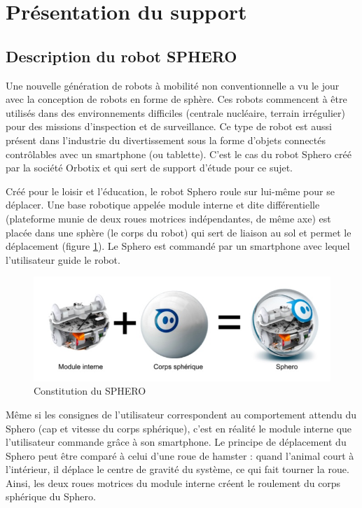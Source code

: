 

\section{Présentation du support}

\subsection{Description du robot SPHERO}

Une nouvelle génération de robots à mobilité non conventionnelle a vu le jour avec la conception de robots en forme de sphère. Ces robots commencent à être utilisés dans des environnements difficiles (centrale nucléaire, terrain irrégulier) pour des missions d'inspection et de surveillance. Ce type de robot est aussi présent dans l'industrie du divertissement sous la forme d'objets connectés contrôlables avec un smartphone (ou tablette). C'est le cas du robot Sphero créé par la société Orbotix et qui sert de support d'étude pour ce sujet. 

Créé pour le loisir et l'éducation, le robot Sphero roule sur lui-même pour se déplacer. Une base robotique appelée module interne et dite différentielle (plateforme munie de deux roues motrices indépendantes, de même axe) est placée dans une sphère (le corps du robot) qui sert de liaison au sol et permet le déplacement (figure \ref{fig1}). Le Sphero est commandé par un smartphone avec lequel l'utilisateur guide le robot.

\begin{figure}[!ht]\begin{center}
 \includegraphics[width=0.8\linewidth]{img/figure_1}
 \caption{Constitution du SPHERO}
 \label{fig1}
\end{center}\end{figure}

Même si les consignes de l'utilisateur correspondent au comportement attendu du Sphero (cap et vitesse du corps sphérique), c'est en réalité le module interne que l'utilisateur commande grâce à son smartphone. Le principe de déplacement du Sphero peut être comparé à celui d'une roue de hamster : quand l'animal court à l'intérieur, il déplace le centre de gravité du système, ce qui fait tourner la roue. Ainsi, les deux roues motrices du module interne créent le roulement du corps sphérique du Sphero. 

